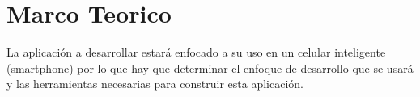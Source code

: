\chapter{Marco Teorico} %
\label{cha:marco_teorico}

La aplicación a desarrollar estará enfocado a su uso en un celular inteligente (smartphone) por lo que hay que determinar el enfoque de desarrollo que se usará y las herramientas necesarias para construir esta aplicación.












